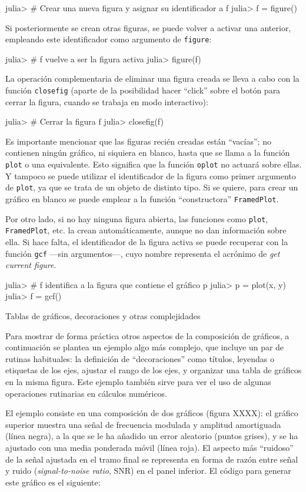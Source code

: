 ﻿\documentclass{article}
\newcommand{\jl}{\texttt}
\begin{document}
julia> # Crear una nueva figura y asignar su identificador a f
julia> f = figure()

Si posteriormente se crean otras figuras, se puede volver a activar una anterior, empleando este identificador como argumento de \jl{figure}:

julia> # f vuelve a ser la figura activa
julia> figure(f)

La operación complementaria de eliminar una figura creada se lleva a cabo con la función \jl{closefig} (aparte de la posibilidad hacer ``click'' sobre el botón para cerrar la figura, cuando se trabaja en modo interactivo):

julia> # Cerrar la figura f
julia> closefig(f)

Es importante mencionar que las figuras recién creadas están ``vacías''; no contienen ningún gráfico, ni siquiera en blanco, hasta que se llama a la función \jl{plot} o una equivalente. Esto significa que la función \jl{oplot} no actuará sobre ellas. Y tampoco se puede utilizar el identificador de la figura como primer argumento de \jl{plot}, ya que se trata de un objeto de distinto tipo. Si se quiere, para crear un gráfico en blanco se puede emplear a la función ``constructora'' \jl{FramedPlot}.

Por otro lado, si no hay ninguna figura abierta, las funciones como \jl{plot}, \jl{FramedPlot}, etc. la crean automáticamente, aunque no dan información sobre ella. Si hace falta, el identificador de la figura activa se puede recuperar con la función \jl{gcf} ---sin argumentos---, cuyo nombre representa el acrónimo de \emph{get current figure}.

julia> # f identifica a la figura que contiene el gráfico p
julia> p = plot(x, y)
julia> f = gcf()


Tablas de gráficos, decoraciones y otras complejidades

Para mostrar de forma práctica otros aspectos de la composición de gráficos, a continuación se plantea un ejemplo algo más complejo, que incluye un par de rutinas habituales: la definición de ``decoraciones'' como títulos, leyendas o etiquetas de los ejes, ajustar el rango de los ejes, y organizar una tabla de gráficos en la misma figura. Este ejemplo también sirve para ver el uso de algunas operaciones rutinarias en cálculos numéricos.

El ejemplo consiste en una composición de dos gráficos (figura XXXX): el gráfico superior muestra una señal de frecuencia modulada y amplitud amortiguada (línea negra), a la que se le ha añadido un error aleatorio (puntos grises), y se ha ajustado con una media ponderada móvil (línea roja). El aspecto más ``ruidoso'' de la señal ajustada en el tramo final se representa en forma de razón entre señal y ruido (\emph{signal-to-noise ratio}, SNR) en el panel inferior. El código para generar este gráfico es el siguiente:
\end{document}
